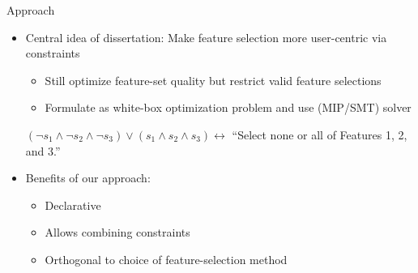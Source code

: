 \documentclass[en, navbarinline, handout]{sdqbeamer}
\begin{document}
\begin{frame}[t]{Approach}
	\begin{itemize}
		\item Central idea of dissertation: Make feature selection more user-centric via constraints
		\begin{itemize}
			\item Still optimize feature-set quality but restrict valid feature selections
			\item Formulate as white-box optimization problem and use (MIP/SMT) solver
		\end{itemize}
		\pause
		\begin{example}
			$(\lnot s_1 \land \lnot s_2 \land \lnot s_3) \lor (s_1 \land s_2 \land s_3) \leftrightarrow$ ``Select none or all of Features 1, 2, and 3.''
		\end{example}
		\pause
		\vspace{0.5\baselineskip}
		\item Benefits of our approach:
		\begin{itemize}
			\item Declarative
			\item Allows combining constraints
			\item Orthogonal to choice of feature-selection method
		\end{itemize}
	\end{itemize}
\end{frame}
\end{document}
